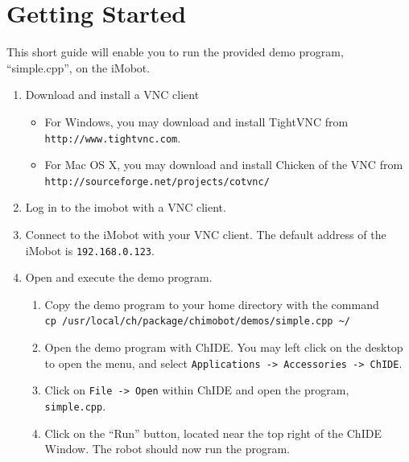 \documentclass[11pt]{report}
\begin{document}
\chapter{Getting Started}
This short guide will enable you to run the provided demo program,
``simple.cpp'', on the iMobot.
\begin{enumerate}
\item Download and install a VNC client
  \begin{itemize}
  \item For Windows, you may download and install TightVNC from \texttt{http://www.tightvnc.com}.
  \item For Mac OS X, you may download and install Chicken of the VNC from\\
  \texttt{http://sourceforge.net/projects/cotvnc/}
  \end{itemize}
\item Log in to the imobot with a VNC client. 
\item Connect to the iMobot with your VNC client. The default address of the iMobot is \texttt{192.168.0.123}.
\item Open and execute the demo program.
  \begin{enumerate}
  \item Copy the demo program to your home directory with the command\\
  \texttt{cp /usr/local/ch/package/chimobot/demos/simple.cpp \textasciitilde/}
  \item Open the demo program with ChIDE. You may left click on the desktop to open the menu, and select \texttt{Applications -> Accessories -> ChIDE}.
  \item Click on \texttt{File -> Open} within ChIDE and open the program, \texttt{simple.cpp}. 
  \item Click on the ``Run'' button, located near the top right of the ChIDE Window. The robot should now run the program.
  \end{enumerate}
\end{enumerate}
\end{document}
